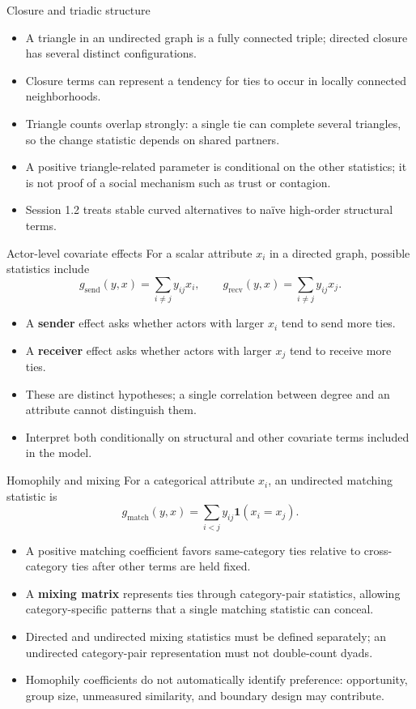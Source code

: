 \documentclass[aspectratio=169,11pt]{beamer}
\newcommand{\ind}{\mathbf{1}}
\newcommand{\term}[1]{\textbf{\color{nupurple}#1}}
\begin{document}
\begin{frame}{Closure and triadic structure}
\begin{itemize}
\item A triangle in an undirected graph is a fully connected triple; directed closure has several distinct configurations.
\item Closure terms can represent a tendency for ties to occur in locally connected neighborhoods.
\item Triangle counts overlap strongly: a single tie can complete several triangles, so the change statistic depends on shared partners.
\item A positive triangle-related parameter is conditional on the other statistics; it is not proof of a social mechanism such as trust or contagion.
\item Session 1.2 treats stable curved alternatives to naïve high-order structural terms.
\end{itemize}
\end{frame}

\begin{frame}{Actor-level covariate effects}
For a scalar attribute $x_i$ in a directed graph, possible statistics include
\[
g_{\mathrm{send}}(y,x)=\sum_{i\ne j}y_{ij}x_i,
\qquad
g_{\mathrm{recv}}(y,x)=\sum_{i\ne j}y_{ij}x_j.
\]
\begin{itemize}
\item A \term{sender} effect asks whether actors with larger $x_i$ tend to send more ties.
\item A \term{receiver} effect asks whether actors with larger $x_j$ tend to receive more ties.
\item These are distinct hypotheses; a single correlation between degree and an attribute cannot distinguish them.
\item Interpret both conditionally on structural and other covariate terms included in the model.
\end{itemize}
\end{frame}

\begin{frame}{Homophily and mixing}
For a categorical attribute $x_i$, an undirected matching statistic is
\[
g_{\mathrm{match}}(y,x)=\sum_{i<j}y_{ij}\ind(x_i=x_j).
\]
\begin{itemize}
\item A positive matching coefficient favors same-category ties relative to cross-category ties after other terms are held fixed.
\item A \term{mixing matrix} represents ties through category-pair statistics, allowing category-specific patterns that a single matching statistic can conceal.
\item Directed and undirected mixing statistics must be defined separately; an undirected category-pair representation must not double-count dyads.
\item Homophily coefficients do not automatically identify preference: opportunity, group size, unmeasured similarity, and boundary design may contribute.
\end{itemize}
\end{frame}
\end{document}
